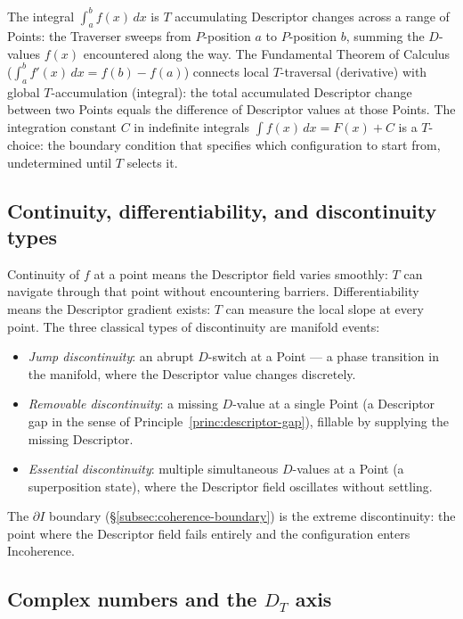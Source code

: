 \documentclass[11pt,a4paper]{article}
\theoremstyle{definition}
\theoremstyle{remark}
\begin{document}
The integral $\int_{a}^{b} f(x)\,dx$ is $T$ accumulating Descriptor changes across a range of Points: the Traverser sweeps from $P$-position $a$ to $P$-position $b$, summing the $D$-values $f(x)$ encountered along the way. The Fundamental Theorem of Calculus ($\int_{a}^{b} f'(x)\,dx = f(b) - f(a)$) connects local $T$-traversal (derivative) with global $T$-accumulation (integral): the total accumulated Descriptor change between two Points equals the difference of Descriptor values at those Points. The integration constant $C$ in indefinite integrals $\int f(x)\,dx = F(x) + C$ is a $T$-choice: the boundary condition that specifies which configuration to start from, undetermined until $T$ selects it.

\subsection{Continuity, differentiability, and discontinuity types}\label{subsec:continuity-types}

Continuity of $f$ at a point means the Descriptor field varies smoothly: $T$ can navigate through that point without encountering barriers. Differentiability means the Descriptor gradient exists: $T$ can measure the local slope at every point. The three classical types of discontinuity are manifold events:
\begin{itemize}[leftmargin=*]
\item \emph{Jump discontinuity}: an abrupt $D$-switch at a Point --- a phase transition in the manifold, where the Descriptor value changes discretely.
\item \emph{Removable discontinuity}: a missing $D$-value at a single Point (a Descriptor gap in the sense of Principle~\ref{princ:descriptor-gap}), fillable by supplying the missing Descriptor.
\item \emph{Essential discontinuity}: multiple simultaneous $D$-values at a Point (a superposition state), where the Descriptor field oscillates without settling.
\end{itemize}
The $\partial I$ boundary (\S\ref{subsec:coherence-boundary}) is the extreme discontinuity: the point where the Descriptor field fails entirely and the configuration enters Incoherence.

\subsection{Complex numbers and the $D_{T}$ axis}\label{subsec:complex-DT}
\end{document}
